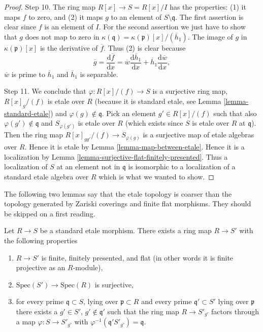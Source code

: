 \begin{proof}
\medskip\noindent
Step 10. The ring map $R[x] \to S = R[x]/I$ has the properties:
(1) it maps $f$ to zero, and
(2) it maps $g$ to an element of $S \setminus \mathfrak q$.
The first assertion is clear since $f$ is an element of $I$.
For the second assertion we just have to show that $g$ does
not map to zero in
$\kappa(\mathfrak q) = \kappa(\mathfrak p)[x]/(\overline{h}_1)$.
The image of $g$ in $\kappa(\mathfrak p)[x]$ is the derivative
of $\overline{f}$. Thus (2) is clear because
$$
\overline{g} =
\frac{\text{d}\overline{f}}{\text{d}x} =
\overline{w}\frac{\text{d}\overline{h}_1}{\text{d}x} +
\overline{h}_1\frac{\text{d}\overline{w}}{\text{d}x},
$$
$\overline{w}$ is prime to $\overline{h}_1$ and
$\overline{h}_1$ is separable.

\medskip\noindent
Step 11.
We conclude that $\varphi : R[x]/(f) \to S$ is a surjective ring map,
$R[x]_g/(f)$ is etale over $R$ (because it is standard etale,
see Lemma \ref{lemma-standard-etale}) and $\varphi(g) \not \in \mathfrak q$.
Pick an element $g' \in R[x]/(f)$ such that
also $\varphi(g') \not \in \mathfrak q$ and $S_{\varphi(g')}$
is etale over $R$ (which exists since $S$ is etale over $R$ at
$\mathfrak q$). Then the ring map
$R[x]_{gg'}/(f) \to S_{\varphi(g)}$ is a surjective map of etale
algebras over $R$. Hence it is etale by Lemma \ref{lemma-map-between-etale}.
Hence it is a localization by
Lemma \ref{lemma-surjective-flat-finitely-presented}.
Thus a localization of $S$ at an element not in $\mathfrak q$ is
isomorphic to a localization of a standard etale algebra over $R$
which is what we wanted to show.
\end{proof}

\noindent
The following two lemmas say that the etale topology is coarser than the
topology generated by Zariski coverings and finite flat morphisms.
They should be skipped on a first reading.

\begin{lemma}
\label{lemma-standard-etale-finite-flat-Zariski}
Let $R \to S$ be a standard etale morphism.
There exists a ring map $R \to S'$ with the following properties
\begin{enumerate}
\item $R \to S'$ is finite, finitely presented, and flat
(in other words it is finite projective as an $R$-module),
\item $\text{Spec}(S') \to \text{Spec}(R)$ is surjective,
\item for every prime $\mathfrak q \subset S$, lying over
$\mathfrak p \subset R$ and every prime
$\mathfrak q' \subset S'$ lying over $\mathfrak p$ there exists
a $g' \in S'$, $g' \not \in \mathfrak q'$
such that the ring map $R \to S'_{g'}$ factors
through a map $\varphi : S \to S'_{g'}$ with
$\varphi^{-1}(\mathfrak q'S'_{g'}) = \mathfrak q$.
\end{enumerate}
\end{lemma}

